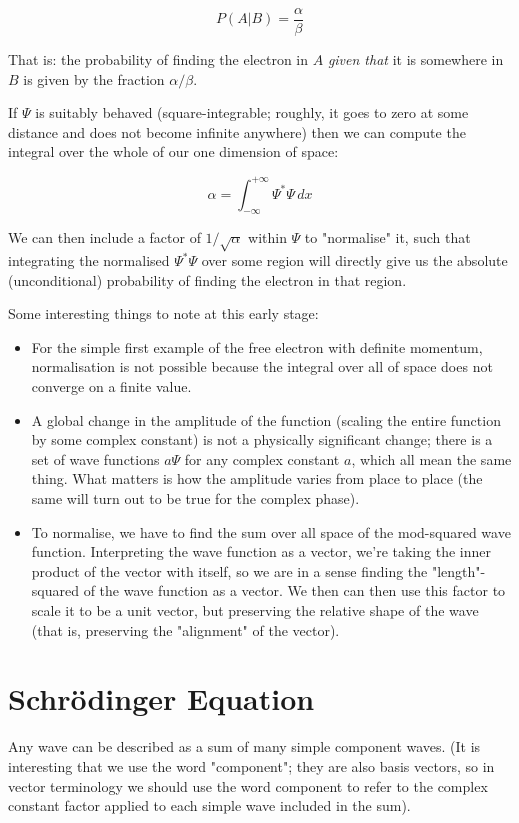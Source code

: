 $$
P(A|B) = \frac{\alpha}{\beta}
$$

That is: the probability of finding the electron in $A$ \textit{given that} it is somewhere in $B$ is given by the fraction $\alpha / \beta$.

If $\Psi$ is suitably behaved (square-integrable; roughly, it goes to zero at some distance and does not become infinite anywhere) then we can compute the integral over the whole of our one dimension of space:

$$
\alpha =
\int_{-\infty}^{+\infty}
\Psi^*\Psi
\,dx
$$

We can then include a factor of $1/\sqrt{\alpha}$ within $\Psi$ to "normalise" it, such that integrating the normalised $\Psi^*\Psi$ over some region will directly give us the absolute (unconditional) probability of finding the electron in that region.

Some interesting things to note at this early stage:

\begin{itemize}
  \item For the simple first example of the free electron with definite momentum, normalisation is not possible because the integral over all of space does not converge on a finite value.
  \item A global change in the amplitude of the function (scaling the entire function by some complex constant) is not a physically significant change; there is a set of wave functions $a\Psi$ for any complex constant $a$, which all mean the same thing. What matters is how the amplitude varies from place to place (the same will turn out to be true for the complex phase).
  \item To normalise, we have to find the sum over all space of the mod-squared wave function. Interpreting the wave function as a vector, we're taking the inner product of the vector with itself, so we are in a sense finding the "length"-squared of the wave function as a vector. We then can then use this factor to scale it to be a unit vector, but preserving the relative shape of the wave (that is, preserving the "alignment" of the vector).
\end{itemize}

\section{Schrödinger Equation}

Any wave can be described as a sum of many simple component waves. (It is interesting that we use the word "component"; they are also basis vectors, so in vector terminology we should use the word component to refer to the complex constant factor applied to each simple wave included in the sum).

